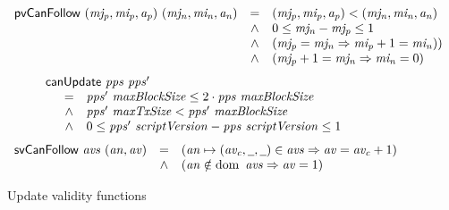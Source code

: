 \begin{figure}[htb]
  \begin{equation}
    \label{eq:func:pv-can-follow}
    \begin{array}{r c l}
      \mathsf{pvCanFollow}~(\mathit{mj_p}, \mathit{mi_p}, \mathit{a_p})~(\mathit{mj_n}, \mathit{mi_n}, \mathit{a_n})
      & = & (\mathit{mj_p}, \mathit{mi_p}, \mathit{a_p}) < (\mathit{mj_n}, \mathit{mi_n}, \mathit{a_n})\\
      & \wedge & 0 \leq \mathit{mj_n} - \mathit{mj_p} \leq 1\\
      & \wedge & (\mathit{mj_p} = \mathit{mj_n} \Rightarrow \mathit{mi_p} + 1 = \mathit{mi_n}))\\
      & \wedge & (\mathit{mj_p} + 1 = \mathit{mj_n} \Rightarrow \mathit{mi_n} = 0)
    \end{array}
  \end{equation}
  \nextdef
  \begin{equation}
    \label{eq:func:can-update}
    \begin{array}{l}
      \mathsf{canUpdate}~\mathit{pps}~\mathit{pps'}\\
      {\begin{array}{r c l}
         & = & \mathit{pps'}~\mathit{maxBlockSize} \leq 2\cdot\mathit{pps}~\mathit{maxBlockSize}\\
         & \wedge & \mathit{pps'}~\mathit{maxTxSize} < \mathit{pps'}~\mathit{maxBlockSize} \\
         & \wedge
             & 0 \leq
               \mathit{pps'}~\mathit{scriptVersion} - \mathit{pps}~\mathit{scriptVersion}
               \leq 1
       \end{array}}
    \end{array}
  \end{equation}
  \nextdef
  \begin{equation}
    \label{eq:func:av-can-follow}
    \begin{array}{r c l}
      \fun{svCanFollow}~\var{avs}~(\var{an}, \var{av}) & =
      & (\var{an} \mapsto (\var{av_c}, \wcard, \wcard) \in \var{avs}
        \Rightarrow \var{av} = \var{av_c} + 1)\\
      & \wedge & (\var{an} \notin \dom~\var{avs} \Rightarrow \var{av} = 1)
    \end{array}
  \end{equation}
  \caption{Update validity functions}
\end{figure}

